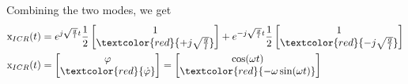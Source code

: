 \begin{examplesection}
    Combining the two modes, we get
    \begin{align*}
        \mathrm{x}_{ICR}(t) & = e^{j\sqrt{\frac{g}{l}}t}\frac{1}{2}
        \begin{bmatrix}
            1 \\
            \textcolor{red}{+j \sqrt{\frac{g}{l}}}
        \end{bmatrix} + e^{-j\sqrt{\frac{g}{l}}t}\frac{1}{2}
        \begin{bmatrix}
            1 \\
            \textcolor{red}{-j \sqrt{\frac{g}{l}}}
        \end{bmatrix}                                \\
        \mathrm{x}_{ICR}(t) & = \begin{bmatrix}
                                    \varphi \\
                                    \textcolor{red}{\dot{\varphi}}
                                \end{bmatrix}
        = \begin{bmatrix}
              \cos(\omega t) \\
              \textcolor{red}{-\omega\sin(\omega t)}
          \end{bmatrix}
    \end{align*}
\end{examplesection}